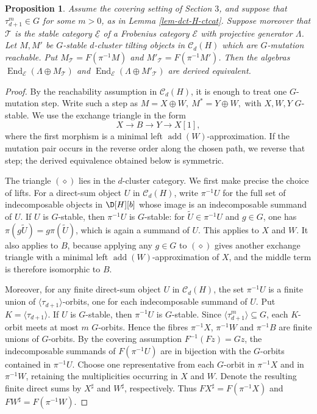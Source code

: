 \documentclass[12pt]{article}
\theoremstyle{plain}
\newtheorem{Prop}[Def]{Proposition}
\theoremstyle{definition}
\DeclareMathOperator{\add}{add}
\DeclareMathOperator{\End}{End}
\newcommand{\Db}[1][]{\D[#1][b]}
\begin{document}
\begin{Prop}\label{prop-G-mutation-derived-equivalence}
Assume the covering setting of Section \(3\), and suppose that
\(\tau_{d+1}^m\in G\) for some \(m>0\), as in Lemma
\ref{lem-dct-H-ctcat}.
Suppose moreover that
\(\mathcal T\) is the stable category \(\underline{\mathcal E}\) of a
Frobenius category \(\mathcal E\) with projective generator \(\Lambda\). Let
\(M,M'\) be \(G\)-stable \(d\)-cluster tilting objects in
\(\mathcal C_d(H)\) which are \(G\)-mutation reachable.  Put
\(M_{\mathcal T}=F(\pi^{-1}M)\) and
\(M'_{\mathcal T}=F(\pi^{-1}M')\).  Then the
algebras
$\End_{\mathcal E}(\Lambda\oplus M_{\mathcal T})$ and  
$\End_{\mathcal E}(\Lambda\oplus M'_{\mathcal T})$ 
are derived equivalent.
\end{Prop}

\begin{proof}
By the reachability assumption in \(\mathcal C_d(H)\), it is enough to treat
one \(G\)-mutation step.  Write such a step as
\(M=X\oplus W,\ M^*=Y\oplus W,\)
with \(X,W,Y\) \(G\)-stable.  We use the exchange triangle in the form
\[
X\longrightarrow B\longrightarrow Y\longrightarrow X[1],
\tag{\(\diamond\)}
\]
where the first morphism is a minimal left \(\add(W)\)-approximation.  If the
mutation pair occurs in the reverse order along the chosen path, we reverse
that step; the derived equivalence obtained below is symmetric.

The triangle \((\diamond)\) lies in the \(d\)-cluster category.  We first make
precise the choice of lifts.  For a direct-sum object \(U\) in
\(\mathcal C_d(H)\), write \(\pi^{-1}U\) for the full set of indecomposable
objects in \(\Db[H]\) whose image is an indecomposable summand of \(U\).  If
\(U\) is \(G\)-stable, then \(\pi^{-1}U\) is \(G\)-stable: for
\(\widetilde U\in\pi^{-1}U\) and \(g\in G\), one has
\(\pi(g\widetilde U)=g\pi(\widetilde U)\), which is again a summand of \(U\).
This applies to \(X\) and \(W\).  It also applies to \(B\), because applying
any \(g\in G\) to \((\diamond)\) gives another exchange triangle with a
minimal left \(\add(W)\)-approximation of \(X\), and the middle term is
therefore isomorphic to \(B\).

Moreover, for any finite direct-sum object \(U\) in \(\mathcal C_d(H)\),
the set \(\pi^{-1}U\) is a finite union of
\(\langle\tau_{d+1}\rangle\)-orbits, one for each indecomposable summand of
\(U\).  Put \(K=\langle\tau_{d+1}\rangle\).  If \(U\) is $G$-stable, then
\(\pi^{-1}U\) is $G$-stable.  Since
\(\langle\tau_{d+1}^m\rangle\subseteq G\), each $K$-orbit meets at most
$m$ $G$-orbits.  Hence the fibres \(\pi^{-1}X\), \(\pi^{-1}W\) and
\(\pi^{-1}B\) are finite unions of $G$-orbits.  By the covering assumption
\(F^{-1}(Fz)=Gz\), the
indecomposable summands of \(F(\pi^{-1}U)\) are in bijection with the
\(G\)-orbits contained in \(\pi^{-1}U\).
Choose one representative from each \(G\)-orbit in \(\pi^{-1}X\) and in
\(\pi^{-1}W\), retaining the multiplicities occurring in \(X\) and \(W\).
Denote the resulting finite direct sums by \(X^\sharp\) and \(W^\sharp\),
respectively.  Thus
\(F X^\sharp=F(\pi^{-1}X)\) and
\(F W^\sharp=F(\pi^{-1}W)\).


\end{proof}
\end{document}
